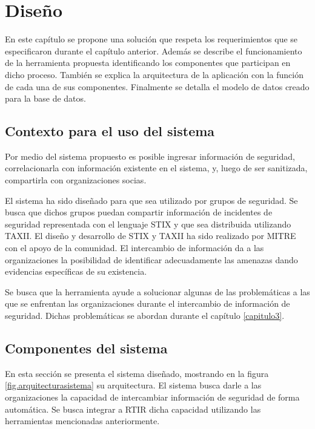 \makeatother
\setlength\tabcolsep{1mm}
\renewcommand\arraystretch{1.3}
\renewcommand\theFigura{\arabic{FiguraCap4}}
\renewcommand\theTabla{\arabic{TablaCap4}}

\chapter{Diseño}
\label{capitulo4}
	En este capítulo se propone una solución que respeta los requerimientos que se especificaron
		durante el capítulo anterior. Además se describe el funcionamiento de la herramienta propuesta identificando los componentes que
		participan en dicho proceso. También se explica la arquitectura de la aplicación con la función de cada una de sus
		componentes. Finalmente se detalla el modelo de datos creado para la base de datos.
	
	\section{Contexto para el uso del sistema} 
	Por medio del sistema propuesto es posible ingresar información de seguridad, correlacionarla
		con información existente en el sistema, y, luego de ser sanitizada, compartirla con organizaciones socias.
	
	
	\bigskip
	
	El sistema ha sido diseñado para que sea utilizado por grupos de seguridad. Se busca que
		dichos grupos puedan compartir información de incidentes de seguridad representada con el lenguaje STIX y que sea
		distribuida utilizando TAXII. El diseño y desarrollo de STIX y TAXII ha sido realizado por MITRE con el apoyo de la
		comunidad. El intercambio de información da a las organizaciones la posibilidad de identificar adecuadamente las
		amenazas dando evidencias específicas de su existencia.
	
	
	\bigskip
	
	Se busca que la herramienta ayude a solucionar algunas de las problemáticas a las que se
		enfrentan las organizaciones durante el intercambio de información de seguridad. Dichas problemáticas se abordan
		durante el capítulo \ref{capitulo3}.
	
	\section{Componentes del sistema}
	
	\bigskip
	
	En esta sección se presenta el sistema diseñado, mostrando en la figura \ref{fig.arquitecturasistema} su arquitectura. El sistema busca darle a las organizaciones la capacidad de intercambiar
		información de seguridad de forma automática. Se busca integrar a RTIR dicha capacidad utilizando las herramientas
		mencionadas anteriormente.
	
